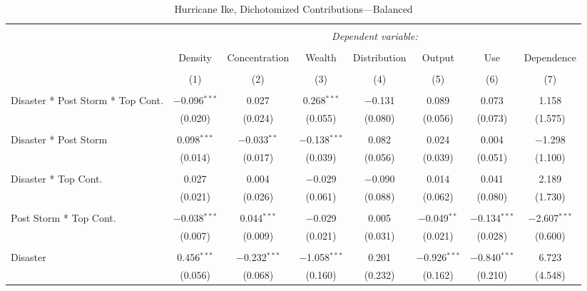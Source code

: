 
\begin{table}[!htbp] \centering 
  \caption{Hurricane Ike, Dichotomized Contributions---Balanced} 
  \label{} 
\footnotesize 
\begin{tabular}{@{\extracolsep{5pt}}lccccccc} 
\\[-1.8ex]\hline 
\hline \\[-1.8ex] 
 & \multicolumn{7}{c}{\textit{Dependent variable:}} \\ 
\cline{2-8} 
\\[-1.8ex] & Density & Concentration & Wealth & Distribution & Output & Use & Dependence \\ 
\\[-1.8ex] & (1) & (2) & (3) & (4) & (5) & (6) & (7)\\ 
\hline \\[-1.8ex] 
 Disaster * Post Storm * Top Cont. & $-$0.096$^{***}$ & 0.027 & 0.268$^{***}$ & $-$0.131 & 0.089 & 0.073 & 1.158 \\ 
  & (0.020) & (0.024) & (0.055) & (0.080) & (0.056) & (0.073) & (1.575) \\ 
  & & & & & & & \\ 
 Disaster * Post Storm & 0.098$^{***}$ & $-$0.033$^{**}$ & $-$0.138$^{***}$ & 0.082 & 0.024 & 0.004 & $-$1.298 \\ 
  & (0.014) & (0.017) & (0.039) & (0.056) & (0.039) & (0.051) & (1.100) \\ 
  & & & & & & & \\ 
 Disaster * Top Cont. & 0.027 & 0.004 & $-$0.029 & $-$0.090 & 0.014 & 0.041 & 2.189 \\ 
  & (0.021) & (0.026) & (0.061) & (0.088) & (0.062) & (0.080) & (1.730) \\ 
  & & & & & & & \\ 
 Post Storm *  Top Cont. & $-$0.038$^{***}$ & 0.044$^{***}$ & $-$0.029 & 0.005 & $-$0.049$^{**}$ & $-$0.134$^{***}$ & $-$2.607$^{***}$ \\ 
  & (0.007) & (0.009) & (0.021) & (0.031) & (0.021) & (0.028) & (0.600) \\ 
  & & & & & & & \\ 
 Disaster & 0.456$^{***}$ & $-$0.232$^{***}$ & $-$1.058$^{***}$ & 0.201 & $-$0.926$^{***}$ & $-$0.840$^{***}$ & 6.723 \\ 
  & (0.056) & (0.068) & (0.160) & (0.232) & (0.162) & (0.210) & (4.548) \\ 

\end{tabular}
\end{table}
